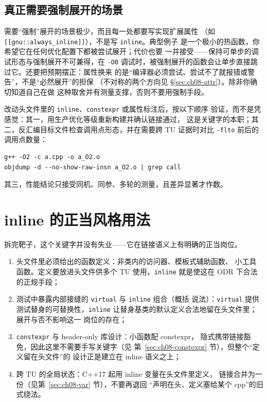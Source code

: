 \documentclass[12pt,a4paper,fontset=fandol]{ctexbook}
\newcommand{\cpp}[1]{C++#1}
\newcommand{\Tp}[1]{\texttt{#1}}
\newcommand{\Bk}{\discretionary{}{}{}}
\begin{document}
\subsection{真正需要强制展开的场景}
\label{sec:ch08-force}

需要``强制''展开的场景极少，而且每一处都要写实现扩展属性
（如 \Tp{[[gnu::always{\Bk}\_inline]]}），不是写 \Tp{inline}。典型例子
是一个极小的热函数，你希望它在任何优化配置下都被尝试展开；代价也要
一并接受——保持可单步的调试形态与强制展开不可兼得，在 \Tp{-O0}
调试时，被强制展开的函数会让单步直接跳过它。还要把预期摆正：属性换来
的是``编译器必须尝试、尝试不了就报错或警告''，不是``必然展开''的担保
（不对称的两个方向见 \S\ref{sec:ch08-attr}）。除非你确切知道自己在做
这种取舍并有测量支撑，否则不要用强制手段。

\begin{bestpractice}[title={验证 inline 相关改动的最小流程}]
改动头文件里的 \Tp{inline}、\Tp{constexpr} 或属性标注后，按以下顺序
验证，而不是凭感觉：其一，用生产优化等级重新构建并确认链接通过，
这是关键字的本职；其二，反汇编目标文件检查调用点形态，并在需要跨
TU 证据时对比 \Tp{-flto} 前后的调用点数量：
\begin{lstlisting}[style=shellstyle]
g++ -O2 -c a.cpp -o a_O2.o
objdump -d --no-show-raw-insn a_O2.o | grep call
\end{lstlisting}
其三，性能结论只接受同机、同参、多轮的测量，且差异显著才作数。
\end{bestpractice}

\section{inline 的正当风格用法}
\label{sec:ch08-legitimate}

拆完靶子，这个关键字并没有失业——它在链接语义上有明确的正当岗位。

\begin{guideline}[title={何时应当写 inline：四岗位清单}]
\begin{enumerate}[label=(\arabic*)]
  \item 头文件里必须给出的函数定义：非类内的访问器、模板式辅助函数、
        小工具函数。定义要放进头文件供多个 TU 使用，\Tp{inline}
        就是使这在 ODR 下合法的正规手段；
  \item 测试中暴露内部接缝的 \Tp{virtual} 与 \Tp{inline} 组合（概括
        说法）：\Tp{virtual} 提供测试替身的可替换性，\Tp{inline}
        让替身基类的默认定义合法地留在头文件里；展开与否不影响这一
        岗位的存在；
  \item \Tp{constexpr} 与 header-only 库设计：小函数配 constexpr，
        隐式携带链接豁免，因此这里不需要手写关键字（见
        第~\ref{sec:ch08-constexpr} 节），但整个``定义留在头文件''的
        设计正是建立在 inline 语义之上；
  \item 跨 TU 的全局状态：\cpp{17} 起用 inline 变量在头文件里定义，
        链接合并为一份（见第~\ref{sec:ch08-var} 节），不要再退回
        ``声明在头、定义塞给某个 cpp''的旧式绕法。
\end{enumerate}
\end{guideline}
\end{document}
